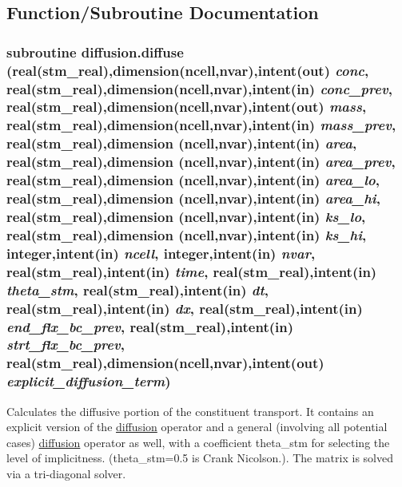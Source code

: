\subsection{Function/Subroutine Documentation}
\hypertarget{a00027_1d88a1781a952a596470deaf3506b476}{
\subsubsection[{diffuse}]{\setlength{\rightskip}{0pt plus 5cm}subroutine diffusion.diffuse (real(stm\_\-real),dimension(ncell,nvar),intent(out) {\em conc}, \/  real(stm\_\-real),dimension(ncell,nvar),intent(in) {\em conc\_\-prev}, \/  real(stm\_\-real),dimension(ncell,nvar),intent(out) {\em mass}, \/  real(stm\_\-real),dimension(ncell,nvar),intent(in) {\em mass\_\-prev}, \/  real(stm\_\-real),dimension (ncell,nvar),intent(in) {\em area}, \/  real(stm\_\-real),dimension (ncell,nvar),intent(in) {\em area\_\-prev}, \/  real(stm\_\-real),dimension (ncell,nvar),intent(in) {\em area\_\-lo}, \/  real(stm\_\-real),dimension (ncell,nvar),intent(in) {\em area\_\-hi}, \/  real(stm\_\-real),dimension (ncell,nvar),intent(in) {\em ks\_\-lo}, \/  real(stm\_\-real),dimension (ncell,nvar),intent(in) {\em ks\_\-hi}, \/  integer,intent(in) {\em ncell}, \/  integer,intent(in) {\em nvar}, \/  real(stm\_\-real),intent(in) {\em time}, \/  real(stm\_\-real),intent(in) {\em theta\_\-stm}, \/  real(stm\_\-real),intent(in) {\em dt}, \/  real(stm\_\-real),intent(in) {\em dx}, \/  real(stm\_\-real),intent(in) {\em end\_\-flx\_\-bc\_\-prev}, \/  real(stm\_\-real),intent(in) {\em strt\_\-flx\_\-bc\_\-prev}, \/  real(stm\_\-real),dimension(ncell,nvar),intent(out) {\em explicit\_\-diffusion\_\-term})}}
\label{a00027_1d88a1781a952a596470deaf3506b476}


Calculates the diffusive portion of the constituent transport. It contains an explicit version of the \hyperlink{a00027}{diffusion} operator and a general (involving all potential cases) \hyperlink{a00027}{diffusion} operator as well, with a coefficient theta\_\-stm for selecting the level of implicitness. (theta\_\-stm=0.5 is Crank Nicolson.). The matrix is solved via a tri-diagonal solver. 

